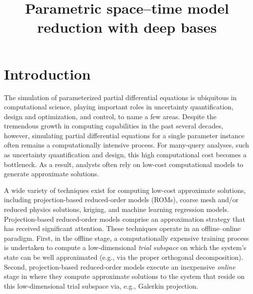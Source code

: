 \documentclass[3p,computermodern,10pt]{elsarticle}
\begin{document}
\begin{frontmatter}

\title{Parametric space--time model reduction with deep bases}

\begin{abstract}
\end{abstract}
\end{frontmatter}


\section{Introduction}
The simulation of parameterized partial differential equations is ubiquitous in computational science, playing important roles in uncertainty quantification, design and optimization, and control, to name a few areas. Despite the tremendous growth in computing capabilities in the past several decades, however, simulating partial differential equations for a single parameter instance often remains a computationally intensive process. For many-query analyses, such as uncertainty quantification and design, this high computational cost becomes a bottleneck. As a result, analysts often rely on low-cost computational models to generate approximate solutions. 

A wide variety of techniques exist for computing low-cost approximate solutions, including projection-based reduced-order models (ROMs), coarse mesh and/or reduced physics solutions, kriging, and machine learning regression models. Projection-based reduced-order models comprise an approximation strategy that has received significant attention. These techniques operate in an offline--online paradigm. First, in the offline stage, a computationally expensive training process is undertaken to compute a low-dimensional \textit{trial subspace} on which the system's state can be well approximated (e.g., via the proper orthogonal decomposition). Second, projection-based reduced-order models execute an inexpensive \textit{online} stage in where they compute approximate solutions to the system that reside on this low-dimensional trial subspace via, e.g., Galerkin projection. 
\end{document}
